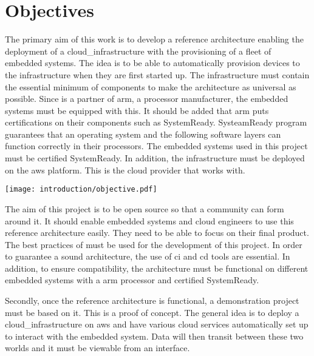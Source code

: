 \section{Objectives}

The primary aim of this work is to develop a reference architecture enabling the deployment of a \gls{cloud_infrastructure} with the \gls{provisioning} of a fleet of embedded systems. The idea is to be able to automatically provision devices to the infrastructure when they are first started up. The infrastructure must contain the essential minimum of components to make the architecture as universal as possible. Since  is a partner of \gls{arm}, a processor manufacturer, the embedded systems must be equipped with this. It should be added that \gls{arm} puts certifications on their components such as SystemReady. SysteamReady program guarantees that an operating system and the following software layers can function correctly in their processors. The embedded systems used in this project must be certified SystemReady. In addition, the infrastructure must be deployed on the \gls{aws} platform. This is the \gls{cloud} provider that  works with.
\begin{center}
    \begingroup
    \texttt{[image: introduction/objective.pdf]}
    \label{fig:objective}
    \endgroup
\end{center}
The aim of this project is to be open source so that a community can form around it. It should enable embedded systems and \gls{cloud} engineers to use this reference architecture easily. They need to be able to focus on their final product. The best practices of  must be used for the development of this project. In order to guarantee a sound architecture, the use of \acrfull{ci} and \acrfull{cd} tools are essential. In addition, to ensure compatibility, the architecture must be functional on different embedded systems with a \gls{arm} processor and certified SystemReady.

Secondly, once the reference architecture is functional, a demonstration project must be based on it. This is a proof of concept. The general idea is to deploy a \gls{cloud_infrastructure} on \gls{aws} and have various \gls{cloud} services automatically set up to interact with the embedded system. Data will then transit between these two worlds and it must be viewable from an interface.



